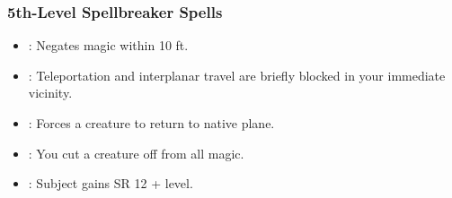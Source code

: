 \subsubsection{5th-Level Spellbreaker Spells}
\begin{itemize}
  \item {}: Negates magic within 10 ft.
  \item {}: Teleportation and interplanar travel are briefly blocked in your immediate vicinity.
  \item {}: Forces a creature to return to native plane.
  \item {}: You cut a creature off from all magic.
  \item {}: Subject gains SR 12 + level.
\end{itemize}